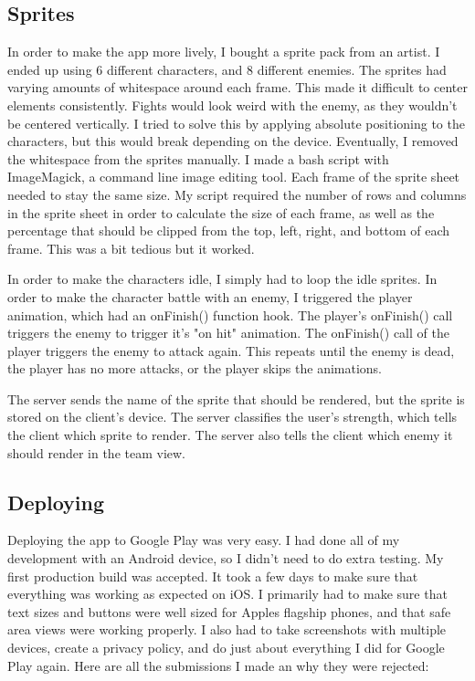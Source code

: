 \documentclass{l4proj}
\begin{document}
\subsection{Sprites}
In order to make the app more lively, I bought a sprite pack from an artist. I ended up using 6 different characters, and 8 different enemies. The sprites had varying amounts of whitespace around each frame. This made it difficult to center elements consistently. Fights would look weird with the enemy, as they wouldn't be centered vertically. I tried to solve this by applying absolute positioning to the characters, but this would break depending on the device. Eventually, I removed the whitespace from the sprites manually. I made a bash script with ImageMagick, a command line image editing tool. Each frame of the sprite sheet needed to stay the same size. My script required the number of rows and columns in the sprite sheet in order to calculate the size of each frame, as well as the percentage that should be clipped from the top, left, right, and bottom of each frame. This was a bit tedious but it worked.

In order to make the characters idle, I simply had to loop the idle sprites. In order to make the character battle with an enemy, I triggered the player animation, which had an onFinish() function hook. The player's onFinish() call triggers the enemy to trigger it's "on hit" animation. The onFinish() call of the player triggers the enemy to attack again. This repeats until the enemy is dead, the player has no more attacks, or the player skips the animations.

The server sends the name of the sprite that should be rendered, but the sprite is stored on the client's device. The server classifies the user's strength, which tells the client which sprite to render. The server also tells the client which enemy it should render in the team view.


\subsection{Deploying}
Deploying the app to Google Play was very easy. I had done all of my development with an Android device, so I didn't need to do extra testing. My first production build was accepted. It took a few days to make sure that everything was working as expected on iOS. I primarily had to make sure that text sizes and buttons were well sized for Apples flagship phones, and that safe area views were working properly. I also had to take screenshots with multiple devices, create a privacy policy, and do just about everything I did for Google Play again. Here are all the submissions I made an why they were rejected:
\end{document}
